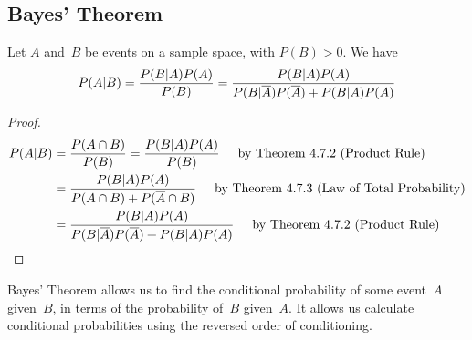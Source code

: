\subsection*{Bayes' Theorem}
\begin{theorem}
Let $A$ and~$B$ be events on a sample space, with $P(B) > 0$. We have
\[
    P(A \vert B) = \frac{P(B \vert A)P(A)}{P(B)}
    = \frac{P(B \vert A)P(A)}{P(B \vert \overline{A})P(\overline{A}) + P(B \vert A)P(A)}
\]
\end{theorem}
\begin{proof}
\begin{align*}
    P(A \vert B)
    &= \frac{P(A \cap B)}{P(B)} 
    = \frac{P(B \vert A)P(A)}{P(B)}\hspace{5mm}\text{by Theorem 4.7.2 (Product Rule)} \\
    &= \frac{P(B \vert A)P(A)}{P(A \cap B) + P(\overline{A} \cap B)}
    \hspace{5mm}\text{by Theorem 4.7.3 (Law of Total Probability)} \\
    &= \frac{P(B \vert A)P(A)}{P(B \vert \overline{A})P(\overline{A}) + P(B \vert A)P(A)}\hspace{5mm}\text{by Theorem 4.7.2 (Product Rule)}
\end{align*}
\end{proof}
\begin{info}
Bayes' Theorem allows us to find the conditional probability of some event~$A$ given~$B$, in terms of the probability of~$B$ given~$A$. It allows us calculate conditional probabilities using the reversed order of conditioning.
\end{info}
